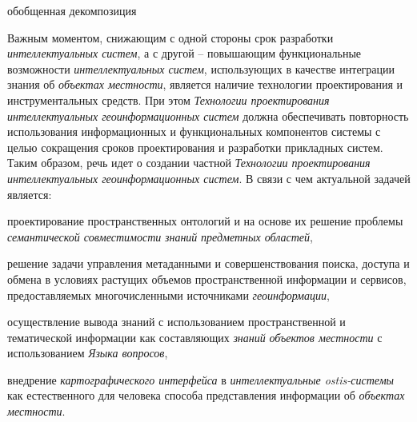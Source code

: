 \begin{SCn}
	
\begin{scnindent}
	\begin{scnrelfromset}{обобщенная декомпозиция}
	\end{scnrelfromset}
\end{scnindent}
	
\end{SCn}

Важным моментом, снижающим с одной стороны срок разработки \textit{интеллектуальных систем}, а с другой – повышающим функциональные возможности \textit{интеллектуальных систем}, использующих в качестве интеграции знания об \textit{объектах местности}, является наличие технологии проектирования и инструментальных средств. При этом \textit{Технологии проектирования интеллектуальных геоинформационных систем} должна обеспечивать повторность использования информационных и функциональных компонентов системы с целью сокращения сроков проектирования и разработки прикладных систем. Таким образом, речь идет о создании частной \textit{Технологии проектирования интеллектуальных геоинформационных систем}. В связи с чем актуальной задачей является: 
\begin{textitemize}
	\item проектирование пространственных онтологий и на основе их решение проблемы \textit{семантической совместимости} \textit{знаний} \textit{предметных областей}, 
	\item решение задачи управления метаданными и совершенствования поиска, доступа и обмена в условиях растущих объемов пространственной информации и сервисов, предоставляемых многочисленными источниками \textit{геоинформации}, 
	\item осуществление вывода знаний с использованием пространственной и тематической информации как составляющих \textit{знаний} \textit{объектов местности} с использованием \textit{Языка вопросов},
	\item внедрение \textit{картографического интерфейса} в \textit{интеллектуальные ostis-системы} как естественного для человека способа представления информации об \textit{объектах местности}.
\end{textitemize}

